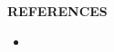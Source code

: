 \thispagestyle{plain}

\begin{center}
	\Large {\bf \uppercase{References}}
\end{center}

\vspace{3\baselineskip}
  

	\begin{itemize}
	\item 
\end{itemize}